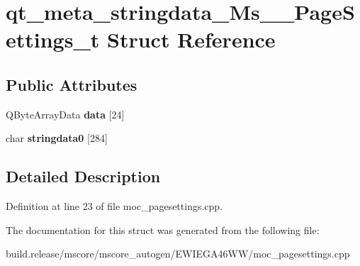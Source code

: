 \hypertarget{structqt__meta__stringdata___ms_____page_settings__t}{}\section{qt\+\_\+meta\+\_\+stringdata\+\_\+\+Ms\+\_\+\+\_\+\+Page\+Settings\+\_\+t Struct Reference}
\label{structqt__meta__stringdata___ms_____page_settings__t}
\subsection*{Public Attributes}
\begin{DoxyCompactItemize}
\item 
\mbox{\label{structqt__meta__stringdata___ms_____page_settings__t_ad66a0ea4f5a336321a9a917bbcb0d8b3}} 
Q\+Byte\+Array\+Data {\bfseries data} \mbox{[}24\mbox{]}
\item 
\mbox{\label{structqt__meta__stringdata___ms_____page_settings__t_aed01198b9f4099a0ed18495dc7e318c5}} 
char {\bfseries stringdata0} \mbox{[}284\mbox{]}
\end{DoxyCompactItemize}


\subsection{Detailed Description}


Definition at line 23 of file moc\+\_\+pagesettings.\+cpp.



The documentation for this struct was generated from the following file\+:\begin{DoxyCompactItemize}
\item 
build.\+release/mscore/mscore\+\_\+autogen/\+E\+W\+I\+E\+G\+A46\+W\+W/moc\+\_\+pagesettings.\+cpp\end{DoxyCompactItemize}
